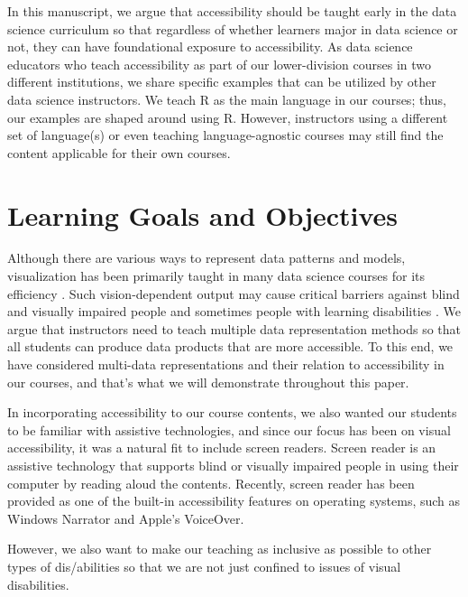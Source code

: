 \documentclass[12pt]{article}
\begin{document}
In this manuscript, we argue that accessibility should be taught early in the data science curriculum so that regardless of whether learners major in data science or not, they can have foundational exposure to accessibility.
As data science educators who teach accessibility as part of our lower-division courses in two different institutions, we share specific examples that can be utilized by other data science instructors.
We teach R \citep{R-base} as the main language in our courses; thus, our examples are shaped around using R. However, instructors using a different set of language(s) or even teaching language-agnostic courses may still find the content applicable for their own courses.

\hypertarget{learning-goals-and-objectives}{%
\section{Learning Goals and Objectives}\label{learning-goals-and-objectives}}

Although there are various ways to represent data patterns and models, visualization has been primarily taught in many data science courses for its efficiency \citep{kimAccessibleVisualizationDesign2021}.
Such vision-dependent output may cause critical barriers against blind and visually impaired people and sometimes people with learning disabilities \citep{kimAccessibleVisualizationDesign2021, marriottInclusiveDataVisualization2021, leeReachingBroaderAudiences2020}.
We argue that instructors need to teach multiple data representation methods so that all students can produce data products that are more accessible.
To this end, we have considered multi-data representations and their relation to accessibility in our courses, and that's what we will demonstrate throughout this paper.

In incorporating accessibility to our course contents, we also wanted our students to be familiar with assistive technologies, and since our focus has been on visual accessibility, it was a natural fit to include screen readers.
Screen reader is an assistive technology that supports blind or visually impaired people in using their computer by reading aloud the contents. Recently, screen reader has been provided as one of the built-in accessibility features on operating systems, such as Windows Narrator and Apple's VoiceOver.

However, we also want to make our teaching as inclusive as possible to other types of dis/abilities so that we are not just confined to issues of visual disabilities.
\end{document}

